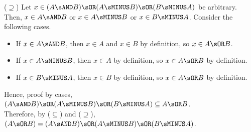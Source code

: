 \begin{enumerate}
\begin{enumerate}
\begin{subprove}
      ($\supseteq$) Let $x \in (A \sAND B) \sOR(A \sMINUS B) \sOR(B \sMINUS A)$ be arbitrary. 
      Then, $x \in A \sAND B$ or $x \in A \sMINUS B$ or $x \in B \sMINUS A$. Consider the following cases.
      \begin{itemize}
        \item If $x \in A \sAND B$, then $x \in A$ and $x \in B$ by definition, so $x \in A \sOR B$.
        \item If $x \in A \sMINUS B$, then $x \in A$ by definition, so $x \in A \sOR B$ by definition.
        \item If $x \in B \sMINUS A$, then $x \in B$ by definition, so $x \in A \sOR B$ by definition.
      \end{itemize}
      Hence, proof by cases, $(A \sAND B) \sOR(A \sMINUS B) \sOR(B \sMINUS A) \subseteq A \sOR B$.\vspace*{5px}\\
      Therefore, by ($\subseteq$) and ($\supseteq$), 
      $(A \sOR B)=(A \sAND B) \sOR(A \sMINUS B) \sOR(B \sMINUS A)$.
    \end{subprove}


\end{enumerate}
\end{enumerate}
